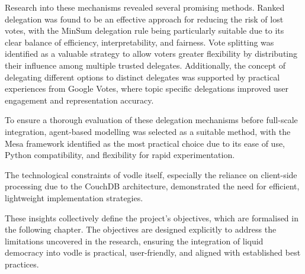 Research into these mechanisms revealed several promising methods. Ranked delegation was found to be an effective approach for reducing the risk of lost votes, with the MinSum delegation rule being particularly suitable due to its clear balance of efficiency, interpretability, and fairness. Vote splitting was identified as a valuable strategy to allow voters greater flexibility by distributing their influence among multiple trusted delegates. Additionally, the concept of delegating different options to distinct delegates was supported by practical experiences from Google Votes, where topic specific delegations improved user engagement and representation accuracy.

To ensure a thorough evaluation of these delegation mechanisms before full-scale integration, agent-based modelling was selected as a suitable method, with the Mesa framework identified as the most practical choice due to its ease of use, Python compatibility, and flexibility for rapid experimentation.

The technological constraints of vodle itself, especially the reliance on client-side processing due to the CouchDB architecture, demonstrated the need for efficient, lightweight implementation strategies.

These insights collectively define the project's objectives, which are formalised in the following chapter. The objectives are designed explicitly to address the limitations uncovered in the research, ensuring the integration of liquid democracy into vodle is practical, user-friendly, and aligned with established best practices.